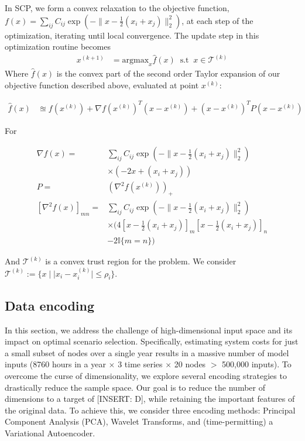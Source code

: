 \documentclass[10pt,twocolumn,letterpaper]{article}
\begin{document}
In SCP, we form a convex relaxation to the objective function, $f(x) =  \sum_{ij} C_{ij} \exp\left(-\lVert x - \frac{1}{2}(x_i + x_j)\rVert _2^2\right)$, at each step of the optimization, iterating until local convergence. The update step in this optimization routine becomes
\begin{align*}
    x^{(k+1)} &= \textrm{argmax}_x \hat{f}(x) \;\; \textrm{s.t} \;\; x \in \mathcal{T}^{(k)}
\end{align*}
Where $\hat{f}(x)$ is the convex part of the second order Taylor expansion of our objective function described above, evaluated at point $x^{(k)}$:
\begin{small}
\begin{align*}
    \hat{f}(x) &\approxeq f(x^{(k)}) + \nabla f(x^{(k)})^T(x - x^{(k)}) + (x - x^{(k)})^T P (x - x^{(k)})
\end{align*}\end{small} 
For
\begin{small}\begin{align*}
    \nabla f(x) =& \sum_{ij} C_{ij} \exp\left(-\lVert x - \frac{1}{2}(x_i + x_j)\rVert ^2_2 \right)\\
    &\times \left(-2x + (x_i + x_j)\right)\\
    P =& \left(\nabla^2 f(x^{(k)})\right)_+\\
    \left[\nabla^2 f(x)\right]_{mn} =& \sum_{ij} C_{ij} \exp\left(-\lVert x - \frac{1}{2}(x_i + x_j)\rVert ^2_2 \right)\\
    &\times (4 \left[x - \frac{1}{2}(x_i + x_j)\right]_m \left[x - \frac{1}{2}(x_i + x_j)\right]_n\\
    &-2\mathbb{I}\{m = n\})
\end{align*}\end{small}
And $\mathcal{T}^{(k)}$ is a convex trust region for the problem. We consider $\mathcal{T}^{(k)} := \{x \mid \lvert x_i - x_i^{(k)}\rvert \leq \rho_i\}$.





\subsection{Data encoding}
In this section, we address the challenge of high-dimensional input space and its impact on optimal scenario selection. Specifically, estimating system costs for just a small subset of nodes over a single year results in a massive number of model inputs (8760 hours in a year $\times$ 3 time series $\times$ 20 nodes $>$ 500,000 inputs). To overcome the curse of dimensionality, we explore several encoding strategies to drastically reduce the sample space. Our goal is to reduce the number of dimensions to a target of [INSERT: D], while retaining the important features of the original data. To achieve this, we consider three encoding methods: Principal Component Analysis (PCA), Wavelet Transforms, and (time-permitting) a Variational Autoencoder.
\end{document}
